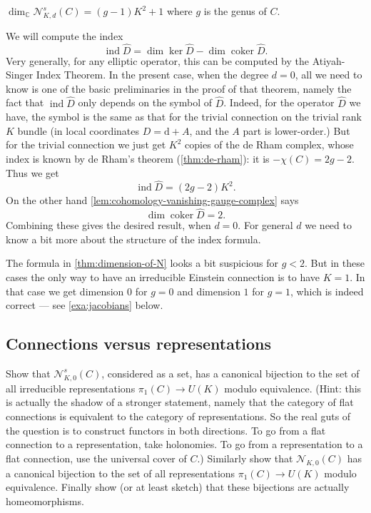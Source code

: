 \documentclass[12pt,letterpaper,reqno]{article}
\numberwithin{equation}{section}
\newcommand{\cN}{\ensuremath{\mathcal N}}
\newcommand{\C}{\ensuremath{\mathbb C}}
\newcommand{\de}{\mathrm{d}}
\DeclareMathOperator{\ind}{ind}
\DeclareMathOperator{\coker}{coker}
\newcommand{\fixme}[1]{{\color{orange}{[#1]}}}
\begin{document}
\begin{thm}[Dimension of $\cN^s_{K,d}(C)$] \label{thm:dimension-of-N}
$\dim_\C \cN^s_{K,d}(C) = (g-1)K^2+1$ where $g$ is the genus of $C$.
\end{thm}
\begin{pf} We will compute the index
\begin{equation}
  \ind \hat{D} = \dim \ker \hat{D} - \dim \coker \hat{D}.
\end{equation}
Very generally, for any elliptic operator, this can be 
computed by the Atiyah-Singer Index Theorem. In the present
case, when the degree $d=0$,
all we need to know is one of the basic
preliminaries in the proof of that theorem, namely the fact that
$\ind \hat{D}$ only depends on the symbol of $\hat{D}$. 
Indeed, for the operator $\hat{D}$ we have, the symbol
is the same as that for the trivial connection on 
the trivial rank $K$ bundle (in local coordinates $D = \de + A$, 
and the $A$ part is lower-order.) But for the trivial 
connection we just get $K^2$ copies of the de Rham 
complex, whose index is known by de Rham's theorem
(\autoref{thm:de-rham}): it is $-\chi(C) = 2g-2$. Thus we get
\begin{equation}
  \ind \hat{D} = (2g-2) K^2.
\end{equation}
On the other hand \autoref{lem:cohomology-vanishing-gauge-complex}
says
\begin{equation}
  \dim \coker \hat{D} = 2.
\end{equation}
Combining these gives the desired result, when $d=0$.
For general $d$ we need to know a bit more about the
structure of the index formula. \fixme{...}
\end{pf}

The formula in \autoref{thm:dimension-of-N} looks a bit
suspicious for $g < 2$. But in these cases
the only way to have an irreducible Einstein 
connection is to have $K=1$. In that case we get dimension
$0$ for $g=0$ and dimension $1$ for $g=1$, which is indeed
correct --- see \autoref{exa:jacobians} below.


\subsection{Connections versus representations}

\begin{exercise} \label{exc:connections-vs-representations} 
Show that $\cN_{K,0}^s(C)$, considered as a set, 
has a canonical bijection to the set of all irreducible representations
$\pi_1(C) \to U(K)$ modulo equivalence. (Hint: this is actually the shadow
of a stronger statement, namely that the category of flat connections is
equivalent to the category of representations. So the real guts of the 
question is to construct functors in both directions. To go from a flat
connection to a representation, take holonomies. To go from 
a representation to a flat connection, use the universal cover of $C$.)
Similarly show that $\cN_{K,0}(C)$ has a canonical bijection to 
the set of all representations
$\pi_1(C) \to U(K)$ modulo equivalence. 
Finally show (or at least sketch) that 
these bijections are actually homeomorphisms.
\end{exercise}
\end{document}

